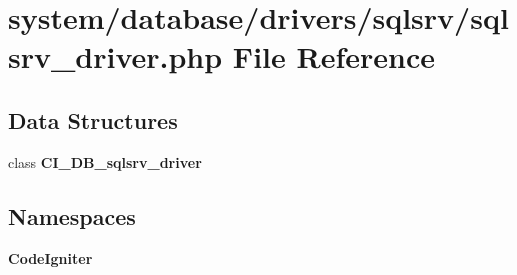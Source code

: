 \section{system/database/drivers/sqlsrv/sqlsrv\-\_\-driver.php File Reference}
\label{sqlsrv__driver_8php}
\subsection*{Data Structures}
\begin{DoxyCompactItemize}
\item 
class {\bf C\-I\-\_\-\-D\-B\-\_\-sqlsrv\-\_\-driver}
\end{DoxyCompactItemize}
\subsection*{Namespaces}
\begin{DoxyCompactItemize}
\item 
{\bf Code\-Igniter}
\end{DoxyCompactItemize}
